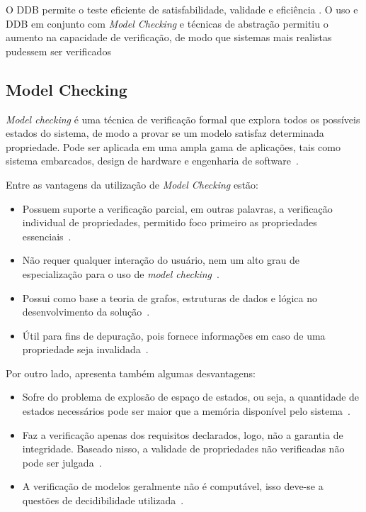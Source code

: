 \par
O DDB permite o teste eficiente de satisfabilidade, validade e eficiência \cite{kropf2013introduction}. O uso e DDB em conjunto com \textit{Model Checking} e técnicas de abstração permitiu o aumento na capacidade de verificação, de modo que sistemas mais realistas pudessem ser verificados\cite{biere2003bounded}

\subsection{Model Checking}
\par
\textit{Model checking} é uma técnica de verificação formal que explora todos os possíveis estados do sistema, de modo a provar se um modelo satisfaz determinada propriedade. Pode ser aplicada em uma ampla gama de aplicações, tais como sistema embarcados, design de hardware e engenharia de software~\cite{baier2008principles}.

\par
Entre as vantagens da utilização de \textit{Model Checking} estão:
\begin{itemize}
    \item Possuem suporte a verificação parcial, em outras palavras, a verificação individual de propriedades, permitido foco primeiro as propriedades essenciais~\cite{baier2008principles}.
    \item Não requer qualquer interação do usuário, nem um alto grau de especialização para o uso de \textit{model checking}~\cite{baier2008principles}.
    \item Possui como base a teoria de grafos, estruturas de dados e lógica no desenvolvimento da solução~\cite{baier2008principles}.
    \item Útil para fins de depuração, pois fornece informações em caso de uma propriedade seja invalidada~\cite{baier2008principles}.
\end{itemize}

\par
Por outro lado, apresenta também algumas desvantagens:
\begin{itemize}
    \item Sofre do problema de explosão de espaço de estados, ou seja, a quantidade de estados necessários pode ser maior que a memória disponível pelo sistema~\cite{baier2008principles}.
    \item Faz a verificação apenas dos requisitos declarados, logo, não a garantia de integridade. Baseado nisso, a validade de propriedades não verificadas não pode ser julgada~\cite{baier2008principles}.
    \item A verificação de modelos geralmente não é computável,  isso deve-se a questões de decidibilidade utilizada~\cite{baier2008principles}.
\end{itemize}

